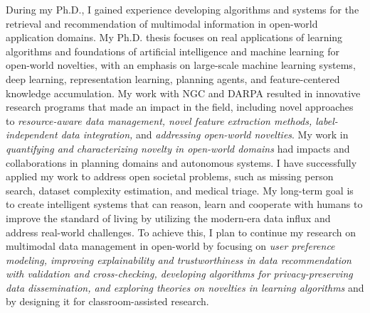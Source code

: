 \documentclass[10pt]{article}
\renewcommand*\paragraph[1]{}
\begin{document}
\paragraph{1 and P1) Earned doctoral degree in computer science or a closely related field}
During my Ph.D., I gained experience developing algorithms and systems for the retrieval and recommendation of multimodal information in open-world application domains. My Ph.D. thesis focuses on real applications of learning algorithms and foundations of artificial intelligence and machine learning for open-world novelties, with an emphasis on large-scale machine learning systems, deep learning, representation learning, planning agents, and feature-centered knowledge accumulation. My work with NGC and DARPA resulted in innovative research programs that made an impact in the field, including novel approaches to \textit{resource-aware data management, novel feature extraction methods, label-independent data integration,} and \textit{addressing open-world novelties}. My work in \textit{quantifying and characterizing novelty in open-world domains} had impacts and collaborations in planning domains and autonomous systems. I have successfully applied my work to address open societal problems, such as missing person search, dataset complexity estimation, and medical triage.
%
My long-term goal is to create intelligent systems that can reason, learn and cooperate with humans to improve the standard of living by utilizing the 
modern-era data influx
and address real-world challenges.
To achieve this, I plan to continue my research on multimodal data management in open-world by focusing on \textit{user preference modeling, improving explainability and trustworthiness in data recommendation with validation and cross-checking, developing algorithms for privacy-preserving data dissemination, and exploring theories on novelties in learning algorithms} and by designing it for classroom-assisted research. 
%
\end{document}
